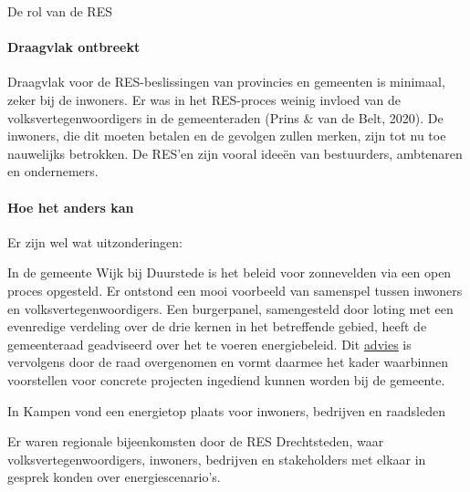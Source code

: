 \begin{voorstel}{De rol van de RES}
\begin{multicols*}{2}
\begin{overwegingen}
\paragraph{Draagvlak ontbreekt}
Draagvlak voor de RES-beslissingen van provincies en gemeenten is minimaal, zeker bij de inwoners. Er was in het RES-proces weinig invloed van de volksvertegenwoordigers in de gemeenteraden (Prins \& van de Belt, 2020). De inwoners, die dit moeten betalen en de gevolgen zullen merken, zijn tot nu toe nauwelijks betrokken. De RES’en zijn vooral ideeën van bestuurders, ambtenaren en ondernemers.

\paragraph{Hoe het anders kan}
Er zijn wel wat uitzonderingen:

In de gemeente Wijk bij Duurstede is het beleid voor zonnevelden via een open proces opgesteld. Er ontstond een mooi voorbeeld van samenspel tussen inwoners en volksvertegenwoordigers. Een burgerpanel, samengesteld door loting met een evenredige verdeling over de drie kernen in het betreffende gebied, heeft de gemeenteraad geadviseerd over het te voeren energiebeleid. Dit \href{https://zonneveldenwijkbijduurstede.nl/wp-content/uploads/2019/11/20190613-Advies-Burgerpanel-zonnevelden.pdf}{advies} is vervolgens door de raad overgenomen en vormt daarmee het kader waarbinnen voorstellen voor concrete projecten ingediend kunnen worden bij de gemeente.

In Kampen vond een energietop plaats voor inwoners, bedrijven en raadsleden

Er waren regionale bijeenkomsten door de RES Drechtsteden, waar volksvertegenwoordigers, inwoners, bedrijven en stakeholders met elkaar in gesprek konden over energiescenario’s.



\end{overwegingen}
\end{multicols*}
\end{voorstel}
